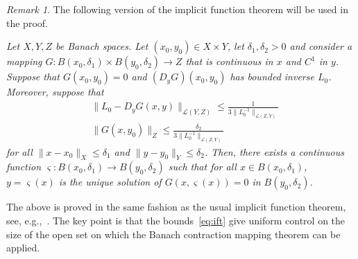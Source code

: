\documentclass[10pt,reqno]{amsart}
\newcommand{\LL}{\mathcal{L}}
\newcommand{\de}{\delta}
\newcommand{\la}{\lambda}
\newcommand{\si}{\varsigma}
\newcommand{\EQ}[1]{\begin{equation}\begin{split} #1 \end{split}\end{equation}}
\numberwithin{equation}{section}
\theoremstyle{remark}
\newtheorem{rem}[thm]{Remark}
\newcommand{\mand}{{\ \ \text{and} \ \  }}
\newcommand{\mif}{{\ \ \text{if} \ \ }}
\newcommand{\0}{\emptyset}
\begin{document}
\begin{rem} \label{r:ift}  The following version of the implicit function theorem will be used in the proof.

 \emph{
Let $X, Y, Z$ be Banach spaces. Let $(x_0, y_0) \in X \times Y$, let $\de_1, \de_2>0$ and consider a mapping  $G: B(x_0, \de_1) \times B(y_0, \de_2) \to Z$ that is continuous in $x$ and $C^1$ in $y$. Suppose that $G(x_0, y_0) = 0$ and $(D_y G)(x_0, y_0)$ has bounded inverse $L_0$. Moreover, suppose that 
\EQ{ \label{eq:ift} 
&\| L_0 - D_y G(x, y) \|_{\LL(Y, Z)} \le \frac{1}{3 \| L_0^{-1} \|_{\LL(Z, Y)}}  \\ %
& \| G(x, y_0) \|_Z \le \frac{\de_2}{ 3 \| L_0^{-1} \|_{\LL(Z, Y)}} %
}
for all $\| x - x_0 \|_{X} \le \de_1$ and $\| y - y_0 \|_Y \le \de_2$. 
Then, there exists a continuous function $\si: B(x_0, \de_1)  \to B(y_0, \de_2)$ such that for all $x \in B(x_0, \de_1)$, $y = \si(x)$ is the unique solution of $G(x, \si(x)) = 0$ in $B(y_0, \de_2)$. 
}

The above is proved in the same fashion as the usual implicit function theorem, see, e.g.,~\cite[Section 2.2]{ChowHale}. The key point is that the bounds~\eqref{eq:ift} give uniform control on the size of the open set on which the Banach contraction mapping theorem can be applied. 
\end{rem} 


%
\end{document}
